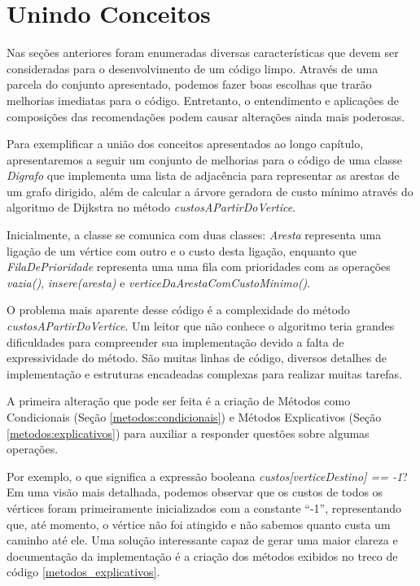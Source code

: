 \section{Unindo Conceitos}
\label{unindo_conceitos}
Nas seções anteriores foram enumeradas diversas características que devem ser consideradas para o desenvolvimento de 
um código limpo. Através de uma parcela do conjunto apresentado, podemos fazer boas escolhas que trarão melhorias 
imediatas para o código. Entretanto, o entendimento e aplicações de composições das recomendações podem causar 
alterações ainda mais poderosas.

Para exemplificar a união dos conceitos apresentados ao longo capítulo, apresentaremos a seguir um 
conjunto de melhorias para o código de uma classe \textit{Digrafo} que implementa uma lista de adjacência para 
representar as arestas de um grafo dirigido, além de calcular a árvore geradora de custo mínimo através do algoritmo de 
Dijkstra no método \textit{custosAPartirDoVertice}.

Inicialmente, a classe se comunica com duas classes: \textit{Aresta} representa uma ligação de um vértice com outro e o 
custo desta ligação, enquanto que \textit{FilaDePrioridade} representa uma uma fila com prioridades com as operações 
\textit{vazia()}, \textit{insere(aresta)} e \textit{verticeDaArestaComCustoMinimo()}.



O problema mais aparente desse código é a complexidade do método \textit{custosAPartirDoVertice}. Um leitor 
que não conhece o algoritmo teria grandes dificuldades para compreender sua implementação devido a falta de 
expressividade do método. São muitas linhas de código, diversos detalhes de implementação e estruturas encadeadas 
complexas para realizar muitas tarefas. 

A primeira alteração que pode ser feita é a criação de Métodos como Condicionais (Seção \ref{metodos:condicionais}) e 
Métodos Explicativos (Seção \ref{metodos:explicativos}) para auxiliar a responder questões sobre algumas operações.

Por exemplo, o que significa a expressão booleana \textit{custos[verticeDestino] == -1}? Em uma visão mais detalhada, 
podemos observar que os custos de todos os vértices foram primeiramente inicializados com a constante ``-1'', 
representando que, até momento, o vértice não foi atingido e não sabemos quanto custa um caminho até ele. Uma solução 
interessante capaz de gerar uma maior clareza e documentação da implementação é a criação dos métodos exibidos
no treco de código \ref{metodos_explicativos}.

